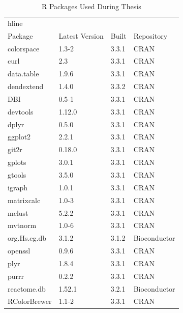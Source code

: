 \setlength\LTleft{0pt}
\setlength\LTright{0pt}
\begin{longtable}{@{\extracolsep{\fill}}|llll|@{}}
\caption{R Packages Used During Thesis}
\label{tab:computers_r_packages}
\\ hline \\
Package      & Latest Version & Built & Repository      \\ \hline
colorspace   & 1.3-2          & 3.3.1 & CRAN            \\ \hline
curl         & 2.3            & 3.3.1 & CRAN            \\ \hline
data.table   & 1.9.6          & 3.3.1 & CRAN            \\ \hline
dendextend   & 1.4.0          & 3.3.2 & CRAN            \\ \hline
DBI          & 0.5-1          & 3.3.1 & CRAN            \\ \hline
devtools     & 1.12.0         & 3.3.1 & CRAN            \\ \hline
dplyr        & 0.5.0          & 3.3.1 & CRAN            \\ \hline
ggplot2      & 2.2.1          & 3.3.1 & CRAN            \\ \hline
git2r        & 0.18.0         & 3.3.1 & CRAN            \\ \hline
gplots       & 3.0.1          & 3.3.1 & CRAN            \\ \hline
gtools       & 3.5.0          & 3.3.1 & CRAN            \\ \hline
igraph       & 1.0.1          & 3.3.1 & CRAN            \\ \hline
matrixcalc   & 1.0-3          & 3.3.1 & CRAN            \\ \hline
mclust       & 5.2.2          & 3.3.1 & CRAN            \\ \hline
mvtnorm      & 1.0-6          & 3.3.1 & CRAN            \\ \hline
org.Hs.eg.db & 3.1.2          & 3.1.2 & Bioconductor    \\ \hline
openssl      & 0.9.6          & 3.3.1 & CRAN            \\ \hline
plyr         & 1.8.4          & 3.3.1 & CRAN            \\ \hline
purrr        & 0.2.2          & 3.3.1 & CRAN            \\ \hline
reactome.db  & 1.52.1         & 3.2.1 & Bioconductor    \\ \hline
RColorBrewer & 1.1-2          & 3.3.1 & CRAN            \\ \hline

\end{longtable}

